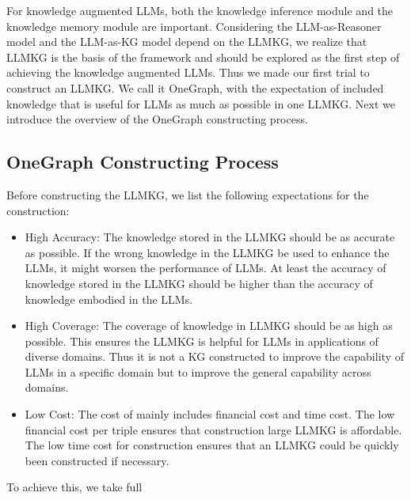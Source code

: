 For knowledge augmented LLMs, both the knowledge inference module and the knowledge memory module are important. Considering the LLM-as-Reasoner model and the LLM-as-KG model depend on the LLMKG, we realize that LLMKG is the basis of the framework and should be explored as the first step of achieving the knowledge augmented LLMs. Thus we made our first trial to construct an LLMKG. We call it OneGraph, with the expectation of included knowledge that is useful for LLMs as much as possible in one LLMKG. Next we introduce the overview of the OneGraph constructing process. 

\subsection{OneGraph Constructing Process}
Before constructing the LLMKG, we list the following expectations for the construction:
\begin{itemize}
    \item High Accuracy: The knowledge stored in the LLMKG should be as accurate as possible. If the wrong knowledge in the LLMKG be used to enhance the LLMs, it might worsen the performance of LLMs. At least the accuracy of knowledge stored in the LLMKG should be higher than the accuracy of knowledge embodied in the LLMs.  
    \item High Coverage: The coverage of knowledge in LLMKG should be as high as possible. This ensures the LLMKG is helpful for LLMs in applications of diverse domains. Thus it is not a KG constructed to improve the capability of LLMs in a specific domain but to improve the general capability across domains. 
    \item Low Cost: The cost of mainly includes financial cost and time cost. The low financial cost per triple ensures that construction large LLMKG is affordable. The low time cost for construction ensures that an LLMKG could be quickly been constructed if necessary. 
\end{itemize}

To achieve this, we take full 





